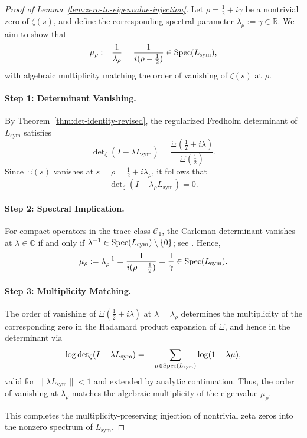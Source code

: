 \begin{proof}[Proof of Lemma~\ref{lem:zero-to-eigenvalue-injection}]
Let \( \rho = \tfrac{1}{2} + i\gamma \) be a nontrivial zero of \( \zeta(s) \), and define the corresponding spectral parameter \( \lambda_\rho := \gamma \in \mathbb{R} \). We aim to show that
\[
\mu_\rho := \frac{1}{\lambda_\rho} = \frac{1}{i(\rho - \tfrac{1}{2})} \in \operatorname{Spec}(L_{\mathrm{sym}}),
\]
with algebraic multiplicity matching the order of vanishing of \( \zeta(s) \) at \( \rho \).

\paragraph{Step 1: Determinant Vanishing.}
By Theorem~\ref{thm:det-identity-revised}, the regularized Fredholm determinant of \( L_{\mathrm{sym}} \) satisfies
\[
\det\nolimits_\zeta(I - \lambda L_{\mathrm{sym}}) = \frac{\Xi(\tfrac{1}{2} + i\lambda)}{\Xi(\tfrac{1}{2})}.
\]
Since \( \Xi(s) \) vanishes at \( s = \rho = \tfrac{1}{2} + i\lambda_\rho \), it follows that
\[
\det\nolimits_\zeta(I - \lambda_\rho L_{\mathrm{sym}}) = 0.
\]

\paragraph{Step 2: Spectral Implication.}
For compact operators in the trace class \( \mathcal{C}_1 \), the Carleman determinant vanishes at \( \lambda \in \mathbb{C} \) if and only if \( \lambda^{-1} \in \operatorname{Spec}(L_{\mathrm{sym}}) \setminus \{0\} \); see \cite{Simon2005TraceIdeals}. Hence,
\[
\mu_\rho := \lambda_\rho^{-1} = \frac{1}{i(\rho - \tfrac{1}{2})} = \frac{1}{\gamma} \in \operatorname{Spec}(L_{\mathrm{sym}}).
\]

\paragraph{Step 3: Multiplicity Matching.}
The order of vanishing of \( \Xi(\tfrac{1}{2} + i\lambda) \) at \( \lambda = \lambda_\rho \) determines the multiplicity of the corresponding zero in the Hadamard product expansion of \( \Xi \), and hence in the determinant via
\[
\log \det\nolimits_\zeta(I - \lambda L_{\mathrm{sym}}) = -\sum_{\mu \in \operatorname{Spec}(L_{\mathrm{sym}})} \log(1 - \lambda \mu),
\]
valid for \( \| \lambda L_{\mathrm{sym}} \| < 1 \) and extended by analytic continuation. Thus, the order of vanishing at \( \lambda_\rho \) matches the algebraic multiplicity of the eigenvalue \( \mu_\rho \).

\medskip
\noindent
This completes the multiplicity-preserving injection of nontrivial zeta zeros into the nonzero spectrum of \( L_{\mathrm{sym}} \).
\end{proof}
%  
